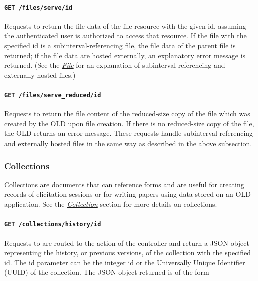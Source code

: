 \documentclass[letterpaper,10pt,english]{sphinxmanual}
\begin{document}
\paragraph{\texttt{GET /files/serve/id}}
\label{interface:get-files-serve-id}
Requests to  return the file data of the file resource
with the given id, assuming the authenticated user is authorized to access that
resource.  If the file with the specified id is a subinterval-referencing file,
the file data of the parent file is returned; if the file data are hosted
externally, an explanatory error message is returned.  (See the
{\hyperref[datastructure:file-data-structure]{\emph{File}}} for an explanation of subinterval-referencing and
externally hosted files.)


\paragraph{\texttt{GET /files/serve\_reduced/id}}
\label{interface:get-files-serve-reduced-id}
Requests to  return the file content of the
reduced-size copy of the file which was created by the OLD upon file creation.
If there is no reduced-size copy of the file, the OLD returns an error message.
These requests handle subinterval-referencing and externally hosted files in the
same way as described in the above subsection.


\subsubsection{Collections}
\label{interface:collections}\label{interface:collection-resource}
Collections are documents that can reference forms and are useful for creating
records of elicitation sessions or for writing papers using data stored on an
OLD application.  See the {\hyperref[datastructure:collection-data-structure]{\emph{Collection}}} section for more
details on collections.


\paragraph{\texttt{GET /collections/history/id}}
\label{interface:get-collections-history-id}
Requests to  are routed to the  action
of the  controller and return a JSON object representing the
history, or previous versions, of the collection with the specified id.  The id
parameter can be the integer id or the
\href{http://en.wikipedia.org/wiki/Universally\_unique\_identifier}{Universally Unique Identifier}
(UUID) of the collection. \footnotemark[10]  The JSON object returned is of the form
\end{document}
